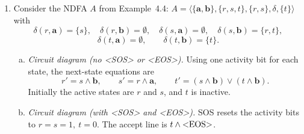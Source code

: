 \begin{enumerate}[{4.}1.]
\begin{enumerate}[(a)]
  \item \emph{Remove $\lambda$-transitions (Definition~4.9).}  The
  $\lambda$-closures are:
  \[
    \Lambda(s_1)=\{s_1,s_2\},\qquad
    \Lambda(s_2)=\{s_2\}.
  \]
  Using the $\lambda$-closure of the original start state, the corresponding
  $\lambda$-free NDFA has start set $\{s_1,s_2\}$. Thus
  \[
  E^{\sigma}_{\lambda}=\langle\{\pmb{a},\pmb{b}\},\{s_1,s_2\},\{s_1,s_2\},
  \delta^{\sigma}_{\lambda},\{s_2\}\rangle
  \]
  with
  \[
  \delta^{\sigma}_{\lambda}(s_1,\pmb{a})=\{s_1,s_2\},\qquad
  \delta^{\sigma}_{\lambda}(s_1,\pmb{b})=\{s_1,s_2\},
  \]
  \[
  \delta^{\sigma}_{\lambda}(s_2,\pmb{a})=\{s_1,s_2\},\qquad
  \delta^{\sigma}_{\lambda}(s_2,\pmb{b})=\{s_1,s_2\}.
  \]

  \item \emph{Convert this NDFA into a DFA (Definition~4.5).}  The full
  deterministic machine has $2^2=4$ subset states, but only one is reachable
  from the start set $\{s_1,s_2\}$:
  \[
  Q_0=\{s_1,s_2\}.
  \]
  This state is final because it contains $s_2$. Its
  transitions are
  \[
  \begin{array}{c|cc}
   & \pmb{a} & \pmb{b}\\\hline
  Q_0 & Q_0 & Q_0
  \end{array}
  \]
  so the connected part of the DFA is a one-state accepting machine.
\end{enumerate}

\item Consider the NDFA $A$ from Example~4.4:
$A=\langle\{\pmb{a},\pmb{b}\},\{r,s,t\},\{r,s\},\delta,\{t\}\rangle$
with
\[
\delta(r,\pmb{a})=\{s\},\quad \delta(r,\pmb{b})=\emptyset,\quad
\delta(s,\pmb{a})=\emptyset,\quad \delta(s,\pmb{b})=\{r,t\},
\]
\[
\delta(t,\pmb{a})=\emptyset,\qquad \delta(t,\pmb{b})=\{t\}.
\]

\begin{enumerate}[(a)]
  \item \emph{Circuit diagram (no \textless SOS\textgreater{} or
    \textless EOS\textgreater).}  Using one activity bit for each state,
    the next-state equations are
    \[
    r' = s\wedge \pmb{b},\qquad
    s' = r\wedge \pmb{a},\qquad
    t' = (s\wedge \pmb{b}) \vee (t\wedge \pmb{b}).
    \]
    Initially the active states are $r$ and $s$, and $t$ is inactive.

  \item \emph{Circuit diagram (with \textless SOS\textgreater{} and
    \textless EOS\textgreater).}  \<SOS\> resets the activity bits to
    $r=s=1,\ t=0$.  The accept line is $t\wedge\text{\text{\textless}EOS\text{\textgreater}}$.


\end{enumerate}
\end{enumerate}
